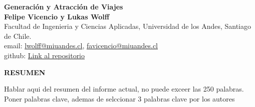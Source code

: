 \documentclass[12pt]{article} %
\begin{document}
\begin{titlepage}%
\newcommand{\HRule}{\rule{\linewidth}{0.5mm}} 
\center 
\begin{center}
    \textbf{\LARGE Generación y Atracción de Viajes} \\[0.5cm]
    \textbf{Felipe Vicencio y Lukas Wolff} \\
    Facultad de Ingenieria y Ciencias Aplicadas, Universidad de los Andes, Santiago de Chile.\\
    email: \href{mailto:lwolff@miuandes.cl}{lwolff@miuandes.cl}, \href{mailto:favicencio@miuandes.cl}{favicencio@miuandes.cl}
    \\
    github: \href{https://github.com/LukasWolff2002/TAREA_2_AUTITOS.git}{Link al repositorio}
\end{center}

\vspace{1cm}

\begin{center}
    \textbf{\large RESUMEN}    
\end{center}

\begin{flushleft}
    Hablar aqui del resumen del informe actual, no puede exceer las 250 palabras. Poner palabras clave, ademas de selccionar 3 palabras clave por los autores
\end{flushleft}


\vspace{1cm}

\end{titlepage}
\end{document}
